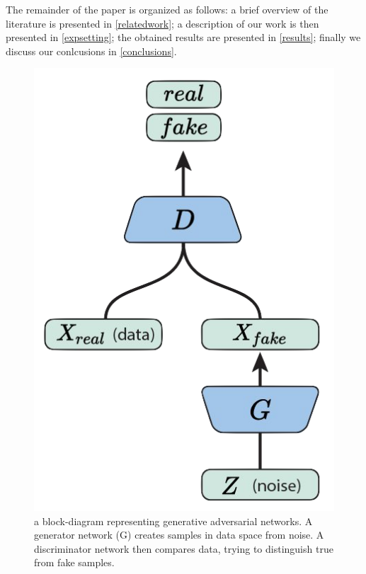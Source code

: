The remainder of the paper is organized as follows: a brief overview of the literature is presented in \ref{relatedwork}; a description of our work is then presented in \ref{expsetting}; the obtained results are presented in \ref{results}; finally we discuss our conlcusions in \ref{conclusions}.


\begin{figure}
	\begin{center}
		\includegraphics[scale=0.25]{./plots/GAN_model.png}
	\end{center}
	\caption{a block-diagram representing generative adversarial networks. A generator network (G) creates samples in data space from noise. A discriminator network then compares data, trying to distinguish true from fake samples.}
	\label{fig:game}
\end{figure}